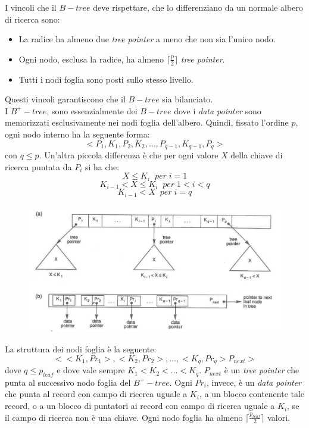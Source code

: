 I vincoli che il $B-tree$ deve rispettare, che lo differenziano da un normale
albero di ricerca sono:
\begin{itemize}
    \item La radice ha almeno due \emph{tree pointer} a meno che non sia l'unico nodo.
    \item Ogni nodo, esclusa la radice, ha almeno $\lceil \frac{p}{2} \rceil$
        \emph{tree pointer}.
    \item Tutti i nodi foglia sono posti sullo stesso livello.
\end{itemize}
Questi vincoli garantiscono che il $B-tree$ sia bilanciato. \\

I $B^+-tree$, sono essenzialmente dei $B-tree$ dove i \emph{data pointer} sono memorizzati
esclusivamente nei nodi foglia dell'albero. Quindi, fissato l'ordine $p$, ogni nodo interno
ha la seguente forma:
\begin{equation*}
    <P_1, K_1, P_2, K_2, \dots, P_{q-1}, K_{q-1}, P_q>
\end{equation*}
con $q \leq p$.
Un'altra piccola differenza è che per ogni valore $X$ della chiave di ricerca
puntata da $P_i$ si ha che:
\begin{equation*}
    X \leq K_i \;\;per\; i = 1
\end{equation*}
\begin{equation*}
    K_{i-1} < X \leq K_i \;\;per\; 1 < i < q
\end{equation*}
\begin{equation*}
    K_{i-1} < X \;\;per\; i = q
\end{equation*}

\begin{figure}[H]
    \centering
    \includegraphics[scale=0.46]{img/b+tree.png}
\end{figure}

La struttura dei nodi foglia è la seguente:
\begin{equation*}
    <<K_1, Pr_1>, <K_2, Pr_2>, \dots, <K_q, Pr_q> P_{next}>
\end{equation*}
dove $q \leq p_{leaf}$ e dove vale sempre $K_1 < K_2 < \dots < K_q$.
$P_{next}$ è un \emph{tree pointer} che punta al successivo nodo foglia
del $B^+-tree$. Ogni $Pr_i$, invece, è un \emph{data pointer} che punta al record
con campo di ricerca uguale a $K_i$, a un blocco contenente tale record, o a un blocco
di puntatori ai record con campo di ricerca uguale a $K_i$, se il campo di ricerca non è una
chiave. Ogni nodo foglia ha almeno $\lceil \frac{p_{leaf}}{2} \rceil$ valori. 

